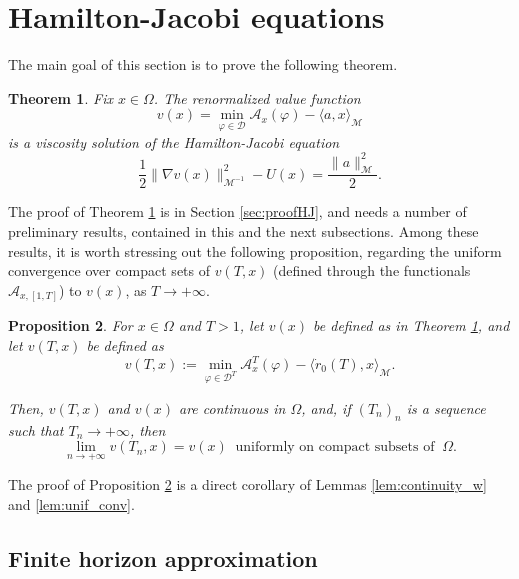 \documentclass[a4paper,10pt]{amsart}
\theoremstyle{plain}
\newtheorem{thm}{Theorem}
\newtheorem{prop}[thm]{Proposition}
\theoremstyle{definition}
\numberwithin{equation}{section}
\numberwithin{thm}{section}
\begin{document}
\section{Hamilton-Jacobi equations}

The main goal of this section is to prove the following theorem.
\begin{thm}
\label{thm:HJ}
    Fix $x\in\Omega$. The renormalized value function
    \begin{equation}
        \label{eq:def_v}
    v(x) = \min_{\varphi\in\mathcal{D}} \mathcal{A}_x(\varphi) - \langle a,x \rangle_\mathcal{M}
      \end{equation}
    is a viscosity solution of the Hamilton-Jacobi equation
    \begin{equation}
        \label{eq:HJ_v}
       \frac{1}{2}\|\nabla v(x)\|_{\mathcal{M}^{-1}}^2 - U(x) = \frac{\|a\|_\mathcal{M}^2}{2}.
     \end{equation}
\end{thm}

The proof of Theorem \ref{thm:HJ} is in Section \ref{sec:proofHJ}, and needs a number of preliminary results, contained in this and the next subsections. Among these results, it is worth stressing out the following proposition, regarding the uniform convergence over compact sets of $v(T,x)$ (defined through the functionals $\mathcal{A}_{x,[1,T]}$) to $v(x)$, as $T\rightarrow+\infty$.

\begin{prop}
\label{prop:conv_v_T}
For $x \in\Omega$ and $T>1$, let $v(x)$ be defined as in Theorem \ref{thm:HJ}, and let $v(T,x)$ be defined as
\begin{equation}\label{eq:v(T,x)}
v(T,x):=\min_{\varphi\in\mathcal{D}^T}\mathcal{A}_{x}^T(\varphi)-\langle \dot r_0(T),x \rangle_\mathcal{M}.
\end{equation}

Then, $v(T,x)$ and $v(x)$ are continuous in $\Omega$, and, if $(T_n)_n$ is a sequence such that $T_n \to +\infty$, then
    \[
    \lim_{n\to +\infty} v(T_n,x)=v(x) \ \mbox{ uniformly on compact subsets of } \ \Omega.
    \]
\end{prop}

The proof of Proposition \ref{prop:conv_v_T} is a direct corollary of  Lemmas \ref{lem:continuity_w} and \ref{lem:unif_conv}.


\subsection{Finite horizon approximation}\label{sec:finite_horizon_approximation}
\end{document}
